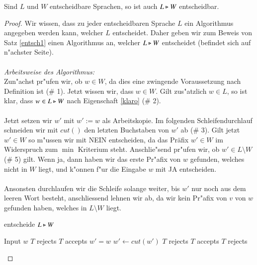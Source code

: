 \begin{satz}\label{entsch1}
Sind $L$ und $W$ entscheidbare Sprachen, so ist auch $L\triangleright W$ entscheidbar.
\end{satz}
\begin{proof}
Wir wissen, dass zu jeder entscheidbaren Sprache $L$ ein Algorithmus angegeben werden kann, welcher $L$ entscheidet. Daher geben wir zum Beweis von Satz \ref{entsch1} einen Algorithmus an, welcher $L\triangleright W$ entscheidet (befindet sich auf n"achster Seite).\\\\
\emph{Arbeitsweise des Algorithmus:}\\
Zun"achst pr"ufen wir, ob $w\in W$, da dies eine zwingende Voraussetzung nach Definition ist (\# 1).
Jetzt wissen wir, dass $w\in W$. Gilt zus"atzlich $w\in L$, so ist klar, dass $w\in L\triangleright W$ nach Eigenschaft \ref{klaro} (\# 2).\\\\
Jetzt setzen wir $w'$ mit $w':=w$ als Arbeitskopie. Im folgenden Schleifendurchlauf schneiden wir mit $cut()$ den letzten Buchstaben von $w'$ ab (\# 3). 
Gilt jetzt $w'\in W$ so m"ussen wir mit NEIN entscheiden, da das Präfix $w'\in W$ im Widerspruch zum $\min$ Kriterium steht.
Anschlie"send pr"ufen wir, ob $w'\in L\setminus W$ (\# 5) gilt. Wenn ja, dann haben wir das erste Pr"afix von $w$ gefunden, welches nicht in $W$ liegt, und k"onnen f"ur die Eingabe $w$ mit JA entscheiden.
\\\\Ansonsten durchlaufen wir die Schleife solange weiter, bis $w'$ nur noch aus dem leeren Wort besteht, anschliessend lehnen wir ab, da wir kein Pr"afix von $v$ von $w$ gefunden haben, welches in $L\setminus W$ liegt.
\begin{algorithm}
\caption{entscheide $L\triangleright W$}
\label{split}
\begin{algorithmic}
\STATE Input $w$
\STATE $T$ rejects 
\ELSE
{}
\STATE $T$ accepts  
\ENDIF
\ENDIF
\STATE $w' = w$  
\REPEAT
\STATE $w' \leftarrow \mathit{cut}(w')$ 
\STATE $T$ rejects
\ENDIF
{}
\STATE $T$ accepts
\ENDIF
{}
\STATE $T$ rejects
\end{algorithmic}
\end{algorithm}

\end{proof}


